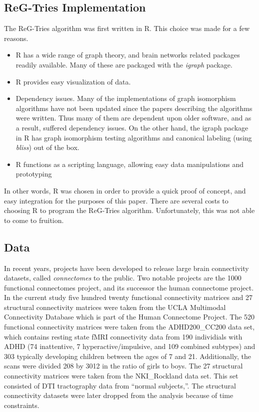 \subsection{ReG-Tries Implementation}
The ReG-Tries algorithm was first written in R. This choice was made for a few reasons. 
\begin{itemize}
\item{R has a wide range of graph theory, and brain networks related packages readily available. Many of these are packaged with the \emph{igraph} package.}
\item{R provides easy visualization of data. }
\item{Dependency issues. Many of the implementations of graph isomorphism algorithms have not been updated since the papers describing the algorithms were written. Thus many of them are dependent upon older software, and as a result, suffered dependency issues. On the other hand, the igraph package in R has graph isomorphism testing algorithms and canonical labeling (using \emph{bliss}) out of the box.}
\item{R functions as a scripting language, allowing easy data manipulations and prototyping}
\end{itemize}
In other words, R was chosen in order to provide a quick proof of concept, and easy integration for the purposes of this paper. 
There are several costs to choosing R to program the ReG-Tries algorithm. Unfortunately, this was not able to come to fruition.



\subsection{Data}
In recent years, projects have been developed to release large  brain connectivity datasets, called \textit{connectomes} to the public. Two notable projects are the 1000 functional connectomes project, and its successor the human connectome project. In the current study five hundred twenty functional connectivity matrices and 27 structural connectivity matrices were taken from the UCLA Multimodal Connectivity Database \cite{jesse11} which is part of the Human Connectome Project. The 520 functional connectivity matrices were taken from the ADHD200\_CC200 data set, which contains resting state fMRI connectivity data from 190 individials with ADHD (74 inattentive, 7 hyperactive/impulsive, and 109 combined subtypes) and 303 typically developing children between the ages of 7 and 21. Additionally, the scans were divided 208 by 3012 in the ratio of girls to boys. The 27 structural connectivity matrices were taken from the NKI\_Rockland data set. This set consisted of DTI tractography data from ``normal subjects,''. The structural connectivity datasets were later dropped from the analysis because of time constraints. 

